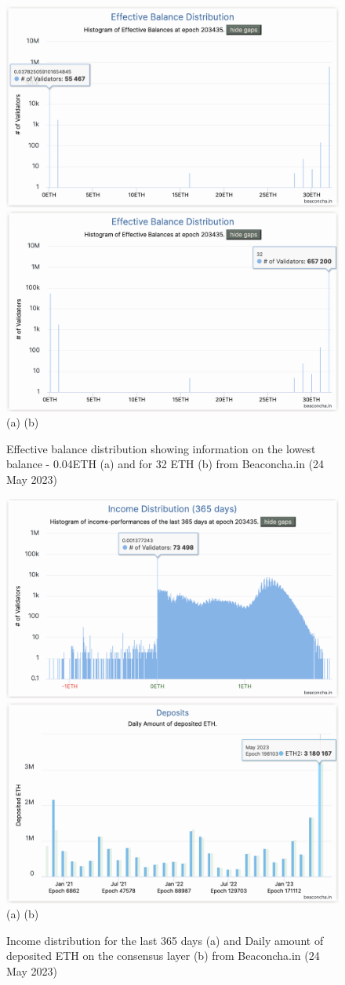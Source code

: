 \documentclass[UTF8]{article}
\begin{document}
\begin{figure}[htbp]
\begin{center}
\includegraphics[width=0.48\linewidth]{images/bchart9a}
\includegraphics[width=0.48\linewidth]{images/bchart9} \\
(a)\hspace{160pt}        (b)\\
\caption{Effective balance distribution showing information on the lowest balance - 0.04ETH (a) and for 32 ETH (b) from Beaconcha.in (24 May 2023)}
\label{fig:chart9}
\end{center}
\end{figure}

\begin{figure}[htbp]
\begin{center}
\includegraphics[width=0.48\linewidth]{images/bchart10}
\includegraphics[width=0.48\linewidth]{images/bchart11a} \\
(a)\hspace{160pt}        (b)\\
\caption{Income distribution for the last 365 days (a) and Daily amount of deposited ETH on the consensus layer (b) from Beaconcha.in (24 May 2023)}
\label{fig:chart10}
\end{center}
\end{figure}
\end{document}
